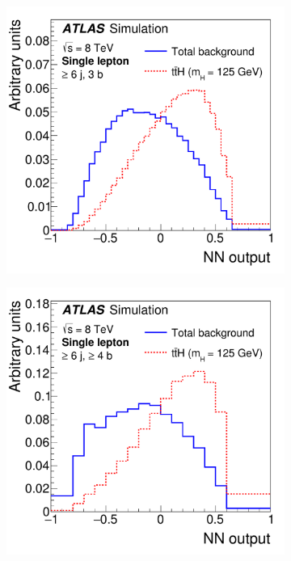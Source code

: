 \begin{figure}[tb!]
\begin{subfigure}{0.49\textwidth}
\caption{}\end{subfigure}
\begin{subfigure}{0.49\textwidth}
\includegraphics[width=\textwidth]{Analysis/Figures_ttH/NN125_6j_3b_kin_ME_6jincl_sep.pdf}\label{fig:Discriminationlj_c}
\caption{}\end{subfigure}
\begin{subfigure}{0.49\textwidth}
\includegraphics[width=\textwidth]{Analysis/Figures_ttH/NN125_6j_ge4b_kin_ME_6jincl_sep.pdf}\label{fig:Discriminationlj_d}

\end{subfigure}
\end{figure}
